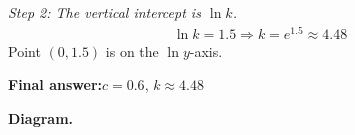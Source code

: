 \documentclass[11pt]{article}
\begin{document}
\textit{Step 2: The vertical intercept is \( \ln k \).}
\[\begin{gathered}
\ln k = 1.5 \Rightarrow k = e^{1.5} \approx 4.48
\end{gathered}\]
Point \( (0, 1.5) \) is on the \( \ln y \)-axis.

\begin{answerbox}
\textbf{Final answer:}\quad \(\displaystyle  c = 0.6 \), \(\displaystyle  k \approx 4.48 \)
\end{answerbox}
\textbf{Diagram.}

\begin{center}
\end{center}
\end{document}
